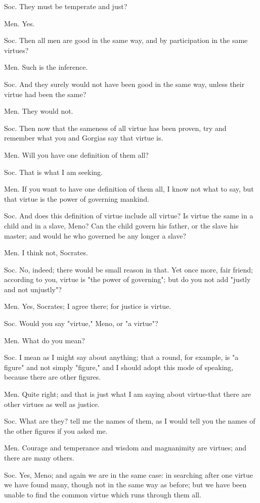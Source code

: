 Soc. They must be temperate and just? 

Men. Yes. 

Soc. Then all men are good in the same way, and by participation in
the same virtues? 

Men. Such is the inference. 

Soc. And they surely would not have been good in the same way, unless
their virtue had been the same? 

Men. They would not. 

Soc. Then now that the sameness of all virtue has been proven, try
and remember what you and Gorgias say that virtue is. 

Men. Will you have one definition of them all? 

Soc. That is what I am seeking. 

Men. If you want to have one definition of them all, I know not what
to say, but that virtue is the power of governing mankind.

Soc. And does this definition of virtue include all virtue? Is virtue
the same in a child and in a slave, Meno? Can the child govern his
father, or the slave his master; and would he who governed be any
longer a slave? 

Men. I think not, Socrates. 

Soc. No, indeed; there would be small reason in that. Yet once more,
fair friend; according to you, virtue is "the power of governing";
but do you not add "justly and not unjustly"? 

Men. Yes, Socrates; I agree there; for justice is virtue.

Soc. Would you say "virtue," Meno, or "a virtue"? 

Men. What do you mean? 

Soc. I mean as I might say about anything; that a round, for example,
is "a figure" and not simply "figure," and I should adopt this mode
of speaking, because there are other figures. 

Men. Quite right; and that is just what I am saying about virtue-that
there are other virtues as well as justice. 

Soc. What are they? tell me the names of them, as I would tell you
the names of the other figures if you asked me. 

Men. Courage and temperance and wisdom and magnanimity are virtues;
and there are many others. 

Soc. Yes, Meno; and again we are in the same case: in searching after
one virtue we have found many, though not in the same way as before;
but we have been unable to find the common virtue which runs through
them all. 

